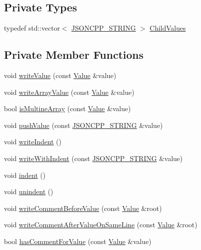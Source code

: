 \subsection*{Private Types}
\begin{DoxyCompactItemize}
\item 
typedef std\+::vector$<$ \hyperlink{json_8hpp_a1e723f95759de062585bc4a8fd3fa4be}{J\+S\+O\+N\+C\+P\+P\+\_\+\+S\+T\+R\+I\+NG} $>$ \hyperlink{classJson_1_1StyledWriter_a798fcefa41730de612a5cf7e73003e8a}{Child\+Values}
\end{DoxyCompactItemize}
\subsection*{Private Member Functions}
\begin{DoxyCompactItemize}
\item 
void \hyperlink{classJson_1_1StyledWriter_ac40143cf43f7c4a94d3d0b41e5245069}{write\+Value} (const \hyperlink{classJson_1_1Value}{Value} \&value)
\item 
void \hyperlink{classJson_1_1StyledWriter_a0618c23d62965515def15ece1e677f5d}{write\+Array\+Value} (const \hyperlink{classJson_1_1Value}{Value} \&value)
\item 
bool \hyperlink{classJson_1_1StyledWriter_aa5dc671edf10b9976f1511da2271ab9d}{is\+Multine\+Array} (const \hyperlink{classJson_1_1Value}{Value} \&value)
\item 
void \hyperlink{classJson_1_1StyledWriter_a236a833b4bdaa09915c2cac715970f08}{push\+Value} (const \hyperlink{json_8hpp_a1e723f95759de062585bc4a8fd3fa4be}{J\+S\+O\+N\+C\+P\+P\+\_\+\+S\+T\+R\+I\+NG} \&value)
\item 
void \hyperlink{classJson_1_1StyledWriter_a885f4bfb5701896d60eee6716d2db7e4}{write\+Indent} ()
\item 
void \hyperlink{classJson_1_1StyledWriter_ac38e02972054125c38efbe327b52f6ac}{write\+With\+Indent} (const \hyperlink{json_8hpp_a1e723f95759de062585bc4a8fd3fa4be}{J\+S\+O\+N\+C\+P\+P\+\_\+\+S\+T\+R\+I\+NG} \&value)
\item 
void \hyperlink{classJson_1_1StyledWriter_a0b65be6186a7c6638270990265e42b97}{indent} ()
\item 
void \hyperlink{classJson_1_1StyledWriter_acee1c9285519b573cfcb00b7e7f5a809}{unindent} ()
\item 
void \hyperlink{classJson_1_1StyledWriter_ad3452c48fabf968bf3693549331ec06e}{write\+Comment\+Before\+Value} (const \hyperlink{classJson_1_1Value}{Value} \&root)
\item 
void \hyperlink{classJson_1_1StyledWriter_ab12b274c62822fc51ec4617c6be95139}{write\+Comment\+After\+Value\+On\+Same\+Line} (const \hyperlink{classJson_1_1Value}{Value} \&root)
\item 
bool \hyperlink{classJson_1_1StyledWriter_a37a806d010f708cb68556f2666f79bdf}{has\+Comment\+For\+Value} (const \hyperlink{classJson_1_1Value}{Value} \&value)
\end{DoxyCompactItemize}
